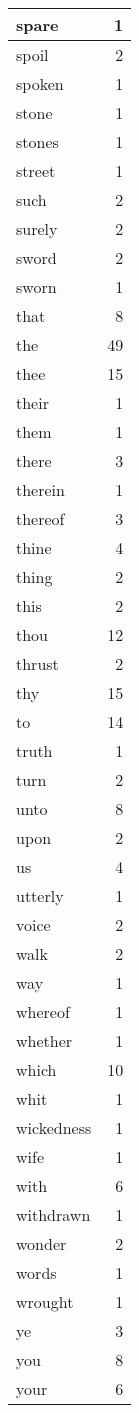 \begin{center}
\begin{longtable}{l|r}
spare & 1 \\ \hline
spoil & 2 \\ \hline
spoken & 1 \\ \hline
stone & 1 \\ \hline
stones & 1 \\ \hline
street & 1 \\ \hline
such & 2 \\ \hline
surely & 2 \\ \hline
sword & 2 \\ \hline
sworn & 1 \\ \hline
that & 8 \\ \hline
the & 49 \\ \hline
thee & 15 \\ \hline
their & 1 \\ \hline
them & 1 \\ \hline
there & 3 \\ \hline
therein & 1 \\ \hline
thereof & 3 \\ \hline
thine & 4 \\ \hline
thing & 2 \\ \hline
this & 2 \\ \hline
thou & 12 \\ \hline
thrust & 2 \\ \hline
thy & 15 \\ \hline
to & 14 \\ \hline
truth & 1 \\ \hline
turn & 2 \\ \hline
unto & 8 \\ \hline
upon & 2 \\ \hline
us & 4 \\ \hline
utterly & 1 \\ \hline
voice & 2 \\ \hline
walk & 2 \\ \hline
way & 1 \\ \hline
whereof & 1 \\ \hline
whether & 1 \\ \hline
which & 10 \\ \hline
whit & 1 \\ \hline
wickedness & 1 \\ \hline
wife & 1 \\ \hline
with & 6 \\ \hline
withdrawn & 1 \\ \hline
wonder & 2 \\ \hline
words & 1 \\ \hline
wrought & 1 \\ \hline
ye & 3 \\ \hline
you & 8 \\ \hline
your & 6 \\ \hline
\end{longtable}
\end{center}



